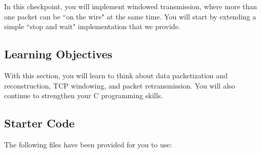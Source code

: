 In this checkpoint, you will implement windowed transmission, where more than one packet can be ``on the wire" at the same time. You will start by extending a simple ``stop and wait" implementation that we provide.

\subsection{Learning Objectives}
With this section, you will learn to think about data packetization and reconstruction, TCP windowing, and packet retransmission. You will also continue to strengthen your C programming skills.

\subsection{Starter Code}
The following files have been provided for you to use:
